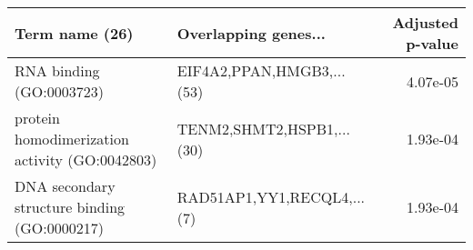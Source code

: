 \begin{tabular}{llr}
\toprule
                                Term name (26) &       Overlapping genes... &  Adjusted p-value \\
\midrule
                      RNA binding (GO:0003723) &  EIF4A2,PPAN,HMGB3,...(53) &          4.07e-05 \\
protein homodimerization activity (GO:0042803) &  TENM2,SHMT2,HSPB1,...(30) &          1.93e-04 \\
  DNA secondary structure binding (GO:0000217) & RAD51AP1,YY1,RECQL4,...(7) &          1.93e-04 \\
\bottomrule
\end{tabular}

